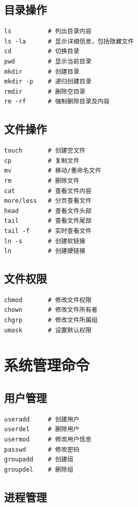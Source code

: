 \documentclass[12pt,UTF8]{ctexbook}
\begin{document}
\subsection*{目录操作}

\begin{verbatim}
ls          # 列出目录内容
ls -la      # 显示详细信息，包括隐藏文件
cd          # 切换目录
pwd         # 显示当前目录
mkdir       # 创建目录
mkdir -p    # 递归创建目录
rmdir       # 删除空目录
rm -rf      # 强制删除目录及内容
\end{verbatim}

\subsection*{文件操作}

\begin{verbatim}
touch       # 创建空文件
cp          # 复制文件
mv          # 移动/重命名文件
rm          # 删除文件
cat         # 查看文件内容
more/less   # 分页查看文件
head        # 查看文件头部
tail        # 查看文件尾部
tail -f     # 实时查看文件
ln -s       # 创建软链接
ln          # 创建硬链接
\end{verbatim}

\subsection*{文件权限}

\begin{verbatim}
chmod       # 修改文件权限
chown       # 修改文件所有者
chgrp       # 修改文件所属组
umask       # 设置默认权限
\end{verbatim}

\section{系统管理命令}
\label{sec:system-commands}

\subsection*{用户管理}

\begin{verbatim}
useradd     # 创建用户
userdel     # 删除用户
usermod     # 修改用户信息
passwd      # 修改密码
groupadd    # 创建组
groupdel    # 删除组
\end{verbatim}

\subsection*{进程管理}
\end{document}
